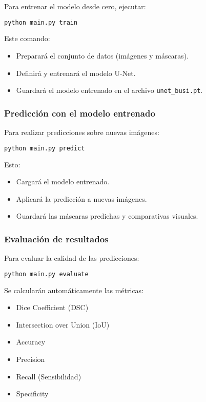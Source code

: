 \documentclass[12pt]{article}
\begin{document}
Para entrenar el modelo desde cero, ejecutar:

\begin{lstlisting}[language=bash]
python main.py train
\end{lstlisting}

Este comando:
\begin{itemize}
    \item Preparará el conjunto de datos (imágenes y máscaras).
    \item Definirá y entrenará el modelo U-Net.
    \item Guardará el modelo entrenado en el archivo \texttt{unet\_busi.pt}.
\end{itemize}

\subsubsection{Predicción con el modelo entrenado}

Para realizar predicciones sobre nuevas imágenes:

\begin{lstlisting}[language=bash]
python main.py predict
\end{lstlisting}

Esto:
\begin{itemize}
    \item Cargará el modelo entrenado.
    \item Aplicará la predicción a nuevas imágenes.
    \item Guardará las máscaras predichas y comparativas visuales.
\end{itemize}

\subsubsection{Evaluación de resultados}

Para evaluar la calidad de las predicciones:

\begin{lstlisting}[language=bash]
python main.py evaluate
\end{lstlisting}

Se calcularán automáticamente las métricas:
\begin{itemize}
    \item Dice Coefficient (DSC)
    \item Intersection over Union (IoU)
    \item Accuracy
    \item Precision
    \item Recall (Sensibilidad)
    \item Specificity
\end{itemize}
\end{document}
